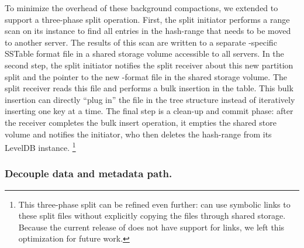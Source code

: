 To minimize the overhead of these background compactions, we extended \ldb{}
to support a three-phase split operation. 
First, the split initiator performs a range scan on its \ldb{} instance to find all
entries in the hash-range that needs to be moved to another server. The results
of this scan are written to a separate \ldb{}-specific SSTable format file in a 
shared storage volume accessible to all \giga{} servers.
In the second step, the split initiator notifies the split receiver about this new
partition split and the pointer to the new \ldb{}-format file in the shared
storage volume. The split receiver reads this file and performs a bulk
insertion in the \ldb{} table. This bulk insertion can
directly ``plug in'' the file in the \ldb{} tree structure instead of
iteratively inserting one key at a time.
The final step is a clean-up and commit phase: after the receiver completes the 
bulk insert operation, it empties the shared store volume and notifies the 
initiator, who then deletes the hash-range from its LevelDB instance.
\footnote
{
This three-phase split can be refined even further: \ldb{} can use symbolic links 
to these split files without explicitly copying the files through shared
storage. Because the current release of \ldb{} does not have support for links, we 
left this optimization for future work. 
}


\subsubsection*{Decouple data and metadata path.}


